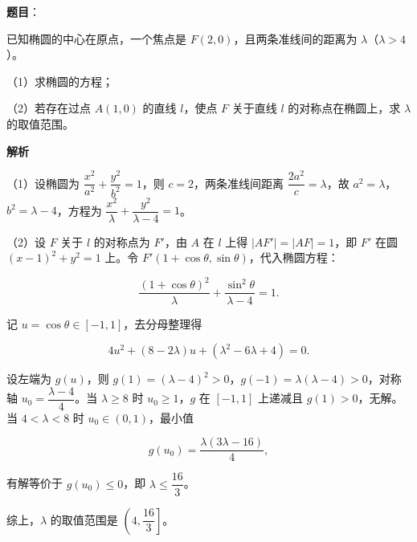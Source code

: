 \begin{answer}

\textbf{题目}：

已知椭圆的中心在原点，一个焦点是 $F(2,0)$，且两条准线间的距离为 $\lambda$（$\lambda>4$）。

（1）求椭圆的方程；

（2）若存在过点 $A(1,0)$ 的直线 $l$，使点 $F$ 关于直线 $l$ 的对称点在椭圆上，求 $\lambda$ 的取值范围。

\textbf{解析}

（1）设椭圆为 $\dfrac{x^2}{a^2}+\dfrac{y^2}{b^2}=1$，则 $c=2$，两条准线间距离 $\dfrac{2a^2}c=\lambda$，故 $a^2=\lambda$，$b^2=\lambda-4$，方程为 $\dfrac{x^2}\lambda+\dfrac{y^2}{\lambda-4}=1$。

（2）设 $F$ 关于 $l$ 的对称点为 $F'$，由 $A$ 在 $l$ 上得 $|AF'|=|AF|=1$，即 $F'$ 在圆 $(x-1)^2+y^2=1$ 上。令 $F'(1+\cos\theta,\sin\theta)$，代入椭圆方程：

\nopagebreak[4]
\[\frac{(1+\cos\theta)^2}{\lambda}+\frac{\sin^2\theta}{\lambda-4}=1.\]

记 $u=\cos\theta\in[-1,1]$，去分母整理得

\nopagebreak[4]
\[4u^2+(8-2\lambda)u+(\lambda^2-6\lambda+4)=0.\]

设左端为 $g(u)$，则 $g(1)=(\lambda-4)^2>0$，$g(-1)=\lambda(\lambda-4)>0$，对称轴 $u_0=\dfrac{\lambda-4}4$。当 $\lambda\geqslant8$ 时 $u_0\geqslant1$，$g$ 在 $[-1,1]$ 上递减且 $g(1)>0$，无解。当 $4<\lambda<8$ 时 $u_0\in(0,1)$，最小值

\nopagebreak[4]
\[g(u_0)=\frac{\lambda(3\lambda-16)}4,\]

有解等价于 $g(u_0)\leqslant0$，即 $\lambda\leqslant\dfrac{16}3$。

综上，$\lambda$ 的取值范围是 $\left(4,\dfrac{16}3\right]$。

\gkanswer{答案：（1）$\dfrac{x^2}\lambda+\dfrac{y^2}{\lambda-4}=1$；（2）$\left(4,\dfrac{16}3\right]$。}

\end{answer}
